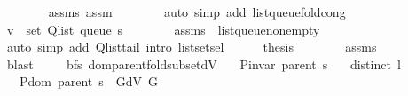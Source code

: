 \begin{isabellebody}
\ \ \ \ \ \ \isamarkupfalse%
\ assms\ assm\isanewline
\ \ \ \ \ \ \isamarkupfalse%
\ {\isacharparenleft}{\kern0pt}auto\ simp\ add{\isacharcolon}{\kern0pt}\ list{\isacharunderscore}{\kern0pt}queue{\isacharunderscore}{\kern0pt}fold{\isacharunderscore}{\kern0pt}cong{\isacharunderscore}{\kern0pt}{}{\isacharparenright}{\kern0pt}\isanewline
\ \ \ \ \isamarkupfalse%
\ {\isachardoublequoteopen}v\ {\isasymin}\ set\ {\isacharparenleft}{\kern0pt}Q{\isacharunderscore}{\kern0pt}list\ {\isacharparenleft}{\kern0pt}queue\ s{\isacharparenright}{\kern0pt}{\isacharparenright}{\kern0pt}{\isachardoublequoteclose}\isanewline
\ \ \ \ \ \ \isamarkupfalse%
\ assms{\isacharparenleft}{\kern0pt}{}{\isacharcomma}{\kern0pt}\ {}{\isacharparenright}{\kern0pt}\ list{\isacharunderscore}{\kern0pt}queue{\isacharunderscore}{\kern0pt}non{\isacharunderscore}{\kern0pt}empty\isanewline
\ \ \ \ \ \ \isamarkupfalse%
\ {\isacharparenleft}{\kern0pt}auto\ simp\ add{\isacharcolon}{\kern0pt}\ Q{\isachardot}{\kern0pt}list{\isacharunderscore}{\kern0pt}tail\ intro{\isacharcolon}{\kern0pt}\ list{\isachardot}{\kern0pt}set{\isacharunderscore}{\kern0pt}sel{\isacharparenleft}{\kern0pt}{}{\isacharparenright}{\kern0pt}{\isacharparenright}{\kern0pt}\isanewline
\ \ \ \ \isamarkupfalse%
\ {\isacharquery}{\kern0pt}thesis\isanewline
\ \ \ \ \ \ \isamarkupfalse%
\ assms{\isacharparenleft}{\kern0pt}{}{\isacharparenright}{\kern0pt}\isanewline
\ \ \ \ \ \ \isamarkupfalse%
\ blast\isanewline
\ \ \isamarkupfalse%
\isanewline
{}\isamarkupfalse%
%
\endisatagproof
{\isafoldproof}%
%
\isadelimproof
\isanewline
%
\endisadelimproof
%
\isadeliminvisible
\isanewline
%
\endisadeliminvisible
%
\isataginvisible
{}\isamarkupfalse%
\ {\isacharparenleft}{\kern0pt}\ bfs{\isacharparenright}{\kern0pt}\ dom{\isacharunderscore}{\kern0pt}parent{\isacharunderscore}{\kern0pt}fold{\isacharunderscore}{\kern0pt}subset{\isacharunderscore}{\kern0pt}dV{\isacharcolon}{\kern0pt}\isanewline
\ \ \ {\isachardoublequoteopen}P{\isacharunderscore}{\kern0pt}invar\ {\isacharparenleft}{\kern0pt}parent\ s{\isacharparenright}{\kern0pt}{\isachardoublequoteclose}\isanewline
\ \ \ {\isachardoublequoteopen}distinct\ l{\isachardoublequoteclose}\isanewline
\ \ \ {\isachardoublequoteopen}P{\isachardot}{\kern0pt}dom\ {\isacharparenleft}{\kern0pt}parent\ s{\isacharparenright}{\kern0pt}\ {\isasymsubseteq}\ G{\isachardot}{\kern0pt}dV\ G{\isachardoublequoteclose}\isanewline

\end{isabellebody}
